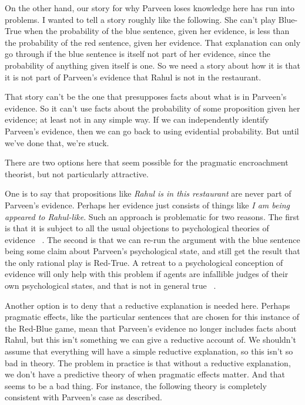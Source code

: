 \documentclass{article}
\begin{document}
On the other hand, our story for why Parveen loses knowledge here has run into problems. I wanted to tell a story roughly like the following. She can't play Blue-True when the probability of the blue sentence, given her evidence, is less than the probability of the red sentence, given her evidence. That explanation can only go through if the blue sentence is itself not part of her evidence, since the probability of anything given itself is one. So we need a story about how it is that it is not part of Parveen's evidence that Rahul is not in the restaurant.

That story can't be the one that presupposes facts about what is in Parveen's evidence. So it can't use facts about the probability of some proposition given her evidence; at least not in any simple way. If we can independently identify Parveen's evidence, then we can go back to using evidential probability. But until we've done that, we're stuck.

There are two options here that seem possible for the pragmatic encroachment theorist, but not particularly attractive. 

One is to say that propositions like \emph{Rahul is in this restaurant} are never part of Parveen's evidence. Perhaps her evidence just consists of things like \emph{I am being appeared to Rahul-like}. Such an approach is problematic for two reasons. The first is that it is subject to all the usual objections to psychological theories of evidence ~\citep{Williamson2007-WILTPO-17}. The second is that we can re-run the argument with the blue sentence being some claim about Parveen's psychological state, and still get the result that the only rational play is Red-True. A retreat to a psychological conception of evidence will only help with this problem if agents are infallible judges of their own psychological states, and that is not in general true ~\citep{Schwitzgebel2008}. 

Another option is to deny that a reductive explanation is needed here. Perhaps pragmatic effects, like the particular sentences that are chosen for this instance of the Red-Blue game, mean that Parveen's evidence no longer includes facts about Rahul, but this isn't something we can give a reductive account of. We shouldn't assume that everything will have a simple reductive explanation, so this isn't so bad in theory. The problem in practice is that without a reductive explanation, we don't have a predictive theory of when pragmatic effects matter. And that seems to be a bad thing. For instance, the following theory is completely consistent with Parveen's case as described.
\end{document}
